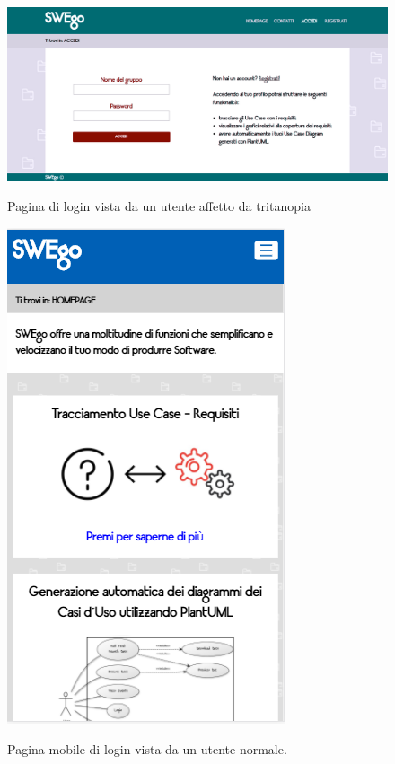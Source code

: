 	\begin{figure}
	\centering
		\includegraphics[scale=0.3]{img/tritanopia.png}\\[1cm] \caption{Pagina di login vista da un utente affetto da tritanopia}
	\end{figure}
		\begin{figure}
	\centering
		\includegraphics[scale=0.8]{img/normale_mobile.jpeg}\\[1cm] \caption{Pagina mobile di login vista da un utente normale.}
	\end{figure}

